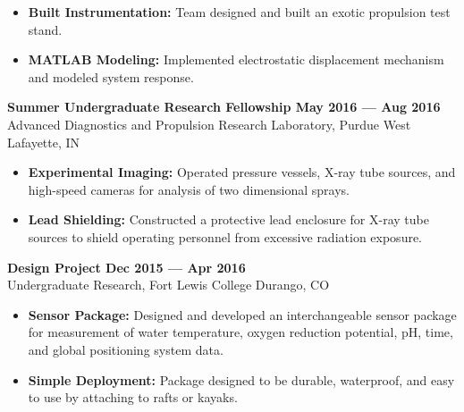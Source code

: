 \begin{itemize}
    \item \textbf{Built Instrumentation:} Team designed and built an exotic propulsion test stand.
    \item \textbf{MATLAB Modeling:} Implemented electrostatic displacement mechanism and modeled system response.
\end{itemize}

\noindent \textbf{Summer Undergraduate Research Fellowship \hfill May 2016 --- Aug 2016}\\
Advanced Diagnostics and Propulsion Research Laboratory, Purdue \dotfill West Lafayette, IN

\begin{itemize}
    \item \textbf{Experimental Imaging:} Operated pressure vessels, X-ray tube sources, and high-speed cameras for analysis of two dimensional sprays.
    \item \textbf{Lead Shielding:} Constructed a protective lead enclosure for X-ray tube sources to shield operating personnel from excessive radiation exposure.
\end{itemize}

\noindent \textbf{Design Project \hfill Dec 2015 --- Apr 2016}\\
Undergraduate Research, Fort Lewis College \dotfill Durango, CO

\begin{itemize}
    \item \textbf{Sensor Package:} Designed and developed an interchangeable sensor package for measurement of water temperature, oxygen reduction potential, pH, time, and global positioning system data.
    \item \textbf{Simple Deployment:} Package designed to be durable, waterproof, and easy to use by attaching to rafts or kayaks.
\end{itemize}
